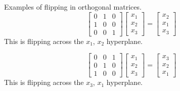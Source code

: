 \begin{example}
    Examples of flipping in orthogonal matrices.
    \[
    \begin{bmatrix}
    0 & 1 & 0 \\
    1 & 0 & 0 \\
    0 & 0 & 1
    \end{bmatrix}
    \begin{bmatrix}
    x_1 \\
    x_2 \\
    x_3
    \end{bmatrix}
    =
    \begin{bmatrix}
    x_2 \\
    x_1 \\
    x_3
    \end{bmatrix}
    \]
    This is flipping across the \(x_1\), \(x_2\) hyperplane.

    \[
    \begin{bmatrix}
    0 & 0 & 1 \\
    0 & 1 & 0 \\
    1 & 0 & 0
    \end{bmatrix}
    \begin{bmatrix}
    x_1 \\
    x_2 \\
    x_3
    \end{bmatrix}
    =
    \begin{bmatrix}
    x_3 \\
    x_2 \\
    x_1
    \end{bmatrix}
    \]
    This is flipping across the \(x_3\), \(x_1\) hyperplane.
\end{example}

